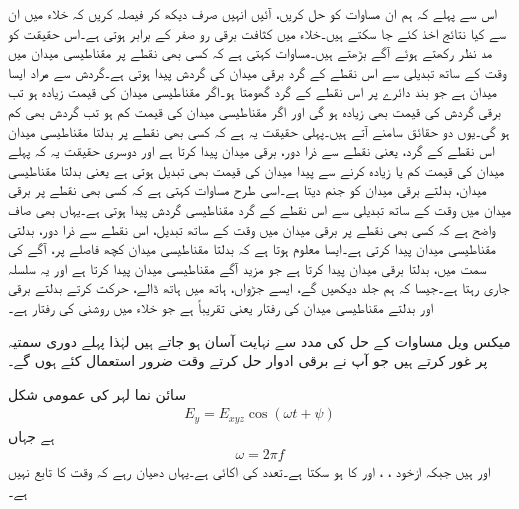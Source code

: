 اس سے پہلے کہ ہم ان مساوات کو حل کریں، آئیں انہیں صرف دیکھ کر فیصلہ کریں کہ خلاء میں ان سے  کیا نتائج اخذ کئے جا سکتے ہیں۔خلاء میں کثافت برقی رو   صفر کے برابر ہوتی ہے۔اس حقیقت کو مد نظر رکھتے ہوئے آگے بڑھتے ہیں۔مساوات  کہتی ہے کہ کسی بھی نقطے پر مقناطیسی میدان میں وقت کے ساتھ تبدیلی سے اس نقطے کے گرد برقی میدان کی گردش پیدا ہوتی ہے۔گردش سے مراد ایسا میدان ہے جو بند دائرے پر اس نقطے کے گرد گھومتا ہو۔اگر مقناطیسی میدان کی قیمت زیادہ ہو تب برقی گردش کی قیمت بھی زیادہ ہو گی اور اگر مقناطیسی میدان کی قیمت کم ہو تب گردش بھی کم ہو گی۔یوں دو حقائق سامنے آتے ہیں۔پہلی حقیقت یہ ہے کہ کسی بھی نقطے پر بدلتا مقناطیسی میدان اس نقطے کے گرد، یعنی نقطے سے ذرا دور، برقی میدان پیدا کرتا ہے اور دوسری حقیقت یہ کہ پہلے میدان کی قیمت کم یا زیادہ کرنے سے پیدا میدان کی قیمت بھی تبدیل ہوتی ہے یعنی بدلتا مقناطیسی میدان، بدلتے برقی میدان کو جنم دیتا ہے۔اسی طرح مساوات  کہتی ہے کہ کسی بھی نقطے پر برقی میدان میں وقت کے ساتھ تبدیلی سے اس نقطے کے گرد مقناطیسی گردش پیدا ہوتی ہے۔یہاں بھی صاف واضح ہے کہ کسی بھی نقطے پر برقی میدان میں وقت کے ساتھ تبدیل، اس نقطے سے ذرا دور، بدلتی مقناطیسی میدان پیدا کرتی ہے۔ایسا معلوم ہوتا ہے کہ بدلتا مقناطیسی میدان کچھ فاصلے پر، آگے کی سمت میں، بدلتا برقی میدان پیدا کرتا ہے جو مزید آگے مقناطیسی میدان پیدا کرتا ہے اور یہ سلسلہ جاری رہتا ہے۔جیسا کہ ہم جلد دیکھیں گے، ایسے جڑواں، ہاتھ میں ہاتھ ڈالے، حرکت کرتے بدلتے برقی اور بدلتے مقناطیسی میدان کی رفتار  یعنی تقریباً  ہے جو خلاء میں روشنی کی رفتار ہے۔

میکس ویل مساوات کے حل  کی مدد سے نہایت آسان ہو جاتے ہیں لہٰذا پہلے دوری سمتیہ پر غور کرتے ہیں جو آپ نے برقی ادوار حل کرتے وقت ضرور استعمال کئے ہوں گے۔

سائن نما لہر کی عمومی شکل 
\begin{align}\label{مساوات_موج_اصل_سائن_نما_تفاعل}
E_y =E_{xyz} \cos (\omega t +\psi)
\end{align} 
ہے جہاں
\begin{align}
\omega =2\pi f
\end{align}
 اور   ہیں جبکہ  ازخود ، ،  اور  کا  ہو سکتا ہے۔تعدد  کی اکائی  ہے۔یہاں دھیان رہے کہ  وقت  کا تابع نہیں ہے۔


